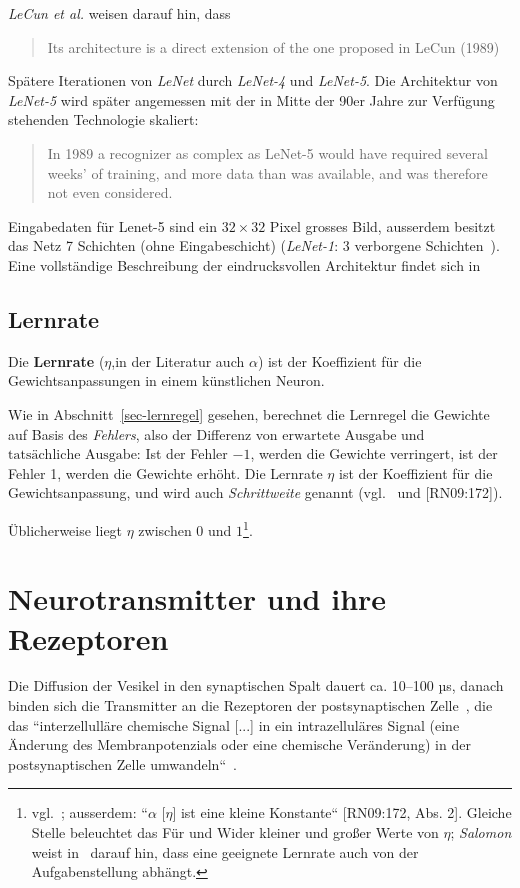 {\textit{LeCun et al.} weisen darauf hin, dass

\blockquote[{\cite[544]{CBD+89}}]{
    Its architecture is a direct extension of the one proposed in LeCun (1989)
}
\noindent
Spätere Iterationen von \textit{LeNet} durch \textit{LeNet-4} und \textit{LeNet-5}. Die Architektur von \textit{LeNet-5} wird später angemessen mit der in Mitte der 90er Jahre zur Verfügung stehenden Technologie skaliert:

\blockquote[{\cite[15]{CBBH98}}]{
    In 1989 a recognizer as complex as LeNet-5 would have required several weeks' of training, and more data than was available, and was therefore not even considered.
}
\noindent
Eingabedaten für Lenet-5 sind ein $32 \times 32$ Pixel grosses Bild, ausserdem besitzt das Netz 7 Schichten (ohne Eingabeschicht) (\textit{LeNet-1}: 3 verborgene Schichten~\cite[544]{CBD+89}).
Eine vollständige Beschreibung der eindrucksvollen Architektur findet sich in\cite[7 f.]{CBBH98}

\subsection*{Lernrate}
Die \textbf{Lernrate} ($\eta$,in der Literatur auch $\alpha$) ist der Koeffizient für die Gewichtsanpassungen in einem künstlichen Neuron.

Wie in Abschnitt~\ref{sec-lernregel} gesehen, berechnet die Lernregel die Gewichte auf Basis des \textit{Fehlers}, also der Differenz von $\text{erwartete Ausgabe}$ und $\text{tatsächliche Ausgabe}$: Ist der Fehler $-1$, werden die Gewichte verringert, ist der Fehler 1, werden die Gewichte erhöht.
Die Lernrate $\eta$ ist der Koeffizient für die Gewichtsanpassung, und wird auch \textit{Schrittweite} genannt (vgl.~\cite[93]{GBC18} und [RN09:172]).

Üblicherweise liegt $\eta$ zwischen $0$ und $1$\footnote{
    vgl.~\cite[61]{Fau94}; ausserdem: ``$\alpha$ [$\eta$] ist eine kleine Konstante`` [RN09:172, Abs. 2]. Gleiche Stelle beleuchtet das Für und Wider kleiner und großer Werte von $\eta$; \textit{Salomon} weist in~\cite[173]{Sal90} darauf hin, dass eine geeignete Lernrate auch von der Aufgabenstellung abhängt.
}.



\section{Neurotransmitter und ihre Rezeptoren}

Die Diffusion der Vesikel in den synaptischen Spalt dauert ca. 10–100 µs, danach binden sich die Transmitter an die Rezeptoren der postsynaptischen Zelle~\cite[96]{HS19a}, die das ``interzellulläre chemische Signal [...] in ein intrazelluläres Signal (eine Änderung des Membranpotenzials oder eine chemische Veränderung) in der postsynaptischen Zelle umwandeln``~\cite[123]{BCP18}.

}
